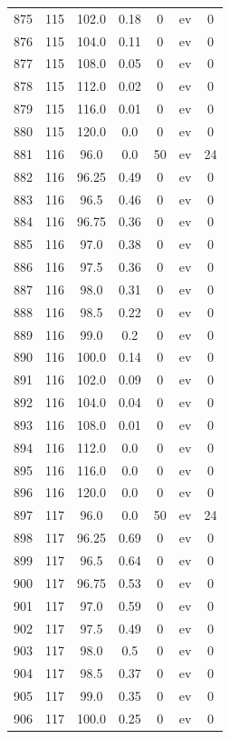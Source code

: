 \documentclass[12pt,a4paper]{article}
\begin{document}
\begin{tabular}{r|cccccc}
	875 & 115 & 102.0 & 0.18 & 0 & ev & 0 \\
	876 & 115 & 104.0 & 0.11 & 0 & ev & 0 \\
	877 & 115 & 108.0 & 0.05 & 0 & ev & 0 \\
	878 & 115 & 112.0 & 0.02 & 0 & ev & 0 \\
	879 & 115 & 116.0 & 0.01 & 0 & ev & 0 \\
	880 & 115 & 120.0 & 0.0 & 0 & ev & 0 \\
	881 & 116 & 96.0 & 0.0 & 50 & ev & 24 \\
	882 & 116 & 96.25 & 0.49 & 0 & ev & 0 \\
	883 & 116 & 96.5 & 0.46 & 0 & ev & 0 \\
	884 & 116 & 96.75 & 0.36 & 0 & ev & 0 \\
	885 & 116 & 97.0 & 0.38 & 0 & ev & 0 \\
	886 & 116 & 97.5 & 0.36 & 0 & ev & 0 \\
	887 & 116 & 98.0 & 0.31 & 0 & ev & 0 \\
	888 & 116 & 98.5 & 0.22 & 0 & ev & 0 \\
	889 & 116 & 99.0 & 0.2 & 0 & ev & 0 \\
	890 & 116 & 100.0 & 0.14 & 0 & ev & 0 \\
	891 & 116 & 102.0 & 0.09 & 0 & ev & 0 \\
	892 & 116 & 104.0 & 0.04 & 0 & ev & 0 \\
	893 & 116 & 108.0 & 0.01 & 0 & ev & 0 \\
	894 & 116 & 112.0 & 0.0 & 0 & ev & 0 \\
	895 & 116 & 116.0 & 0.0 & 0 & ev & 0 \\
	896 & 116 & 120.0 & 0.0 & 0 & ev & 0 \\
	897 & 117 & 96.0 & 0.0 & 50 & ev & 24 \\
	898 & 117 & 96.25 & 0.69 & 0 & ev & 0 \\
	899 & 117 & 96.5 & 0.64 & 0 & ev & 0 \\
	900 & 117 & 96.75 & 0.53 & 0 & ev & 0 \\
	901 & 117 & 97.0 & 0.59 & 0 & ev & 0 \\
	902 & 117 & 97.5 & 0.49 & 0 & ev & 0 \\
	903 & 117 & 98.0 & 0.5 & 0 & ev & 0 \\
	904 & 117 & 98.5 & 0.37 & 0 & ev & 0 \\
	905 & 117 & 99.0 & 0.35 & 0 & ev & 0 \\
	906 & 117 & 100.0 & 0.25 & 0 & ev & 0 \\

\end{tabular}
\end{document}
